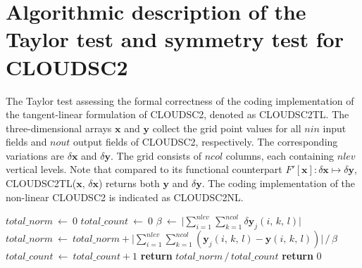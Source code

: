 \documentclass[main.tex]{subfiles}
\begin{document}
    \section{Algorithmic description of the Taylor test and symmetry test for CLOUDSC2}
    \label{section:appendix}


    \begin{algorithm}[H]
        \caption{The Taylor test assessing the formal correctness of the coding implementation of the tangent-linear formulation of CLOUDSC2, denoted as \textsc{CLOUDSC2TL}. The three-dimensional arrays $\mathbf{x}$ and $\mathbf{y}$ collect the grid point values for all $nin$ input fields and $nout$ output fields of CLOUDSC2, respectively. The corresponding variations are $\delta \mathbf{x}$ and $\delta \mathbf{y}$. The grid consists of $ncol$ columns, each containing $nlev$ vertical levels. Note that compared to its functional counterpart $F' \left[\boldsymbol{x} \right] : \delta \boldsymbol{x} \mapsto \delta \boldsymbol{y}$, \textsc{CLOUDSC2TL($\mathbf{x}, \, \delta \mathbf{x}$)} returns both $\mathbf{y}$ and $\delta \mathbf{y}$. The coding implementation of the non-linear CLOUDSC2 is indicated as \textsc{CLOUDSC2NL}.}
        \label{alg:taylor-test}

        \begin{algorithmic}[1]
             
                \State $total\_norm ~ \gets ~ 0$
                \State $total\_count ~ \gets ~ 0$
                    \State $\beta ~ \gets ~ \big| \sum_{i=1}^{nlev} \sum_{k=1}^{ncol} \delta \mathbf{y}_j \left( i, \, k, \, l \right) \big|$
                        \State $total\_norm ~ \gets ~ total\_norm + \big| \sum_{i=1}^{nlev} \sum_{k=1}^{ncol} \left( \mathbf{y}_j \left( i, \, k, \, l \right) - \mathbf{y} \left( i, \, k, \, l \right) \right) \big| \, / \, \beta$
                        \State $total\_count ~ \gets ~ total\_count + 1$
                    \EndIf
                \EndFor
                    \State \textbf{return} $total\_norm \, / \, total\_count$
                \Else
                    \State \textbf{return} 0
                \EndIf
            \EndFunction
            

\end{algorithmic}
\end{algorithm}
\end{document}
